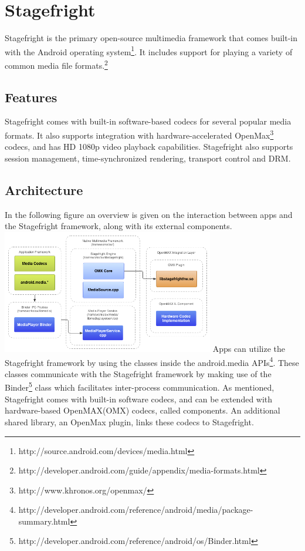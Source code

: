 \section{Stagefright}
Stagefright is the primary open-source multimedia framework that comes built-in with the Android operating system\footnote{http://source.android.com/devices/media.html}. It includes support for playing a variety of common media file formats.\footnote{http://developer.android.com/guide/appendix/media-formats.html}
\subsection{Features}
Stagefright comes with built-in software-based codecs for several popular media formats. It also supports integration with hardware-accelerated OpenMax\footnote{http://www.khronos.org/openmax/} codecs, and has HD 1080p video playback capabilities. Stagefright also supports session management, time-synchronized rendering, transport control and DRM.
\subsection{Architecture}
In the following figure an overview is given on the interaction between apps and the Stagefright framework, along with its external components.\\
\includegraphics[width=350px]{video_decoding/native.png}
Apps can utilize the Stagefright framework by using the classes inside the android.media APIs\footnote{http://developer.android.com/reference/android/media/package-summary.html}. These classes communicate with the Stagefright framework by making use of the Binder\footnote{http://developer.android.com/reference/android/os/Binder.html} class which facilitates inter-process communication. As mentioned, Stagefright comes with built-in software codecs, and can be extended with hardware-based OpenMAX(OMX) codecs, called components. An additional shared library, an OpenMax plugin, links these codecs to Stagefright.

